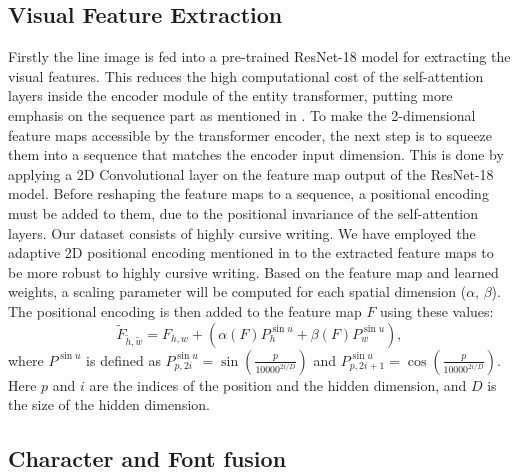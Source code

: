 \documentclass[conference]{IEEEtran}
\begin{document}
\subsection{Visual Feature Extraction}\label{visual_feat}
Firstly the line image is fed into a pre-trained ResNet-18 model \cite{7780459} for extracting the visual features. This reduces the high computational cost of the self-attention layers inside the encoder module of the entity transformer, putting more emphasis on the sequence part as mentioned in \cite{faucris.276690551}. To make the 2-dimensional feature maps accessible by the transformer encoder, the next step is to squeeze them into a sequence that matches the encoder input dimension. This is done by applying a 2D Convolutional layer on the feature map output of the ResNet-18 model. Before reshaping the feature maps to a sequence, a positional encoding must be added to them, due to the positional invariance of the self-attention layers. Our dataset consists of highly cursive writing. We have employed the adaptive 2D positional encoding mentioned in \cite{lee2019recognizing} to the extracted feature maps to be more robust to highly cursive writing.
Based on the feature map and learned weights, a scaling parameter will be computed for each spatial dimension (\(\alpha\), \(\beta\)). The positional encoding is then added to the feature map \(F\) using these values:
\begin{equation}\label{AD2DPE}
\tilde{F}_{\tilde{h},\tilde{w}} = {{F_{h,w} + \left( \alpha(F)P^{\sin u}_{h} + \beta(F)P^{\sin u}_{w} \right),}} \tag{1}
\end{equation}
where \(P^{\sin u}\) is defined as \( P^{\sin u}_{p, 2i} = \sin\left(\frac{p}{{10000}^{2i/D}}\right) \) and \( P^{\sin u}_{p, 2i+1} = \cos\left(\frac{p}{{10000}^{2i/D}}\right) \). Here \( p \) and \( i \) are the indices of the position and the hidden dimension, and \( D \) is the size of the hidden dimension.\newline

\subsection{Character and Font fusion}\label{sem_feat}
\end{document}
